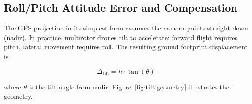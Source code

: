 \documentclass[10pt,a4paper]{article}
\begin{document}
\subsection{Roll/Pitch Attitude Error and Compensation}\label{sec:cv:rollpitch}

The GPS projection in its simplest form assumes the camera points straight down (nadir).  In practice, multirotor drones tilt to accelerate: forward flight requires pitch, lateral movement requires roll.  The resulting ground footprint displacement is

\begin{equation}\label{eq:tilt}
  \Delta_\mathrm{tilt} = h \cdot \tan(\theta)
\end{equation}

\noindent where $\theta$ is the tilt angle from nadir.  Figure~\ref{fig:tilt-geometry} illustrates the geometry.
\end{document}
